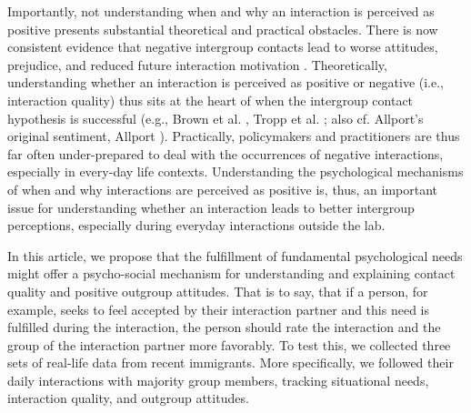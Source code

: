 \documentclass[man, 12pt, a4paper, mask]{apa7}
\theoremstyle{break}
\theoremstyle{plain}
\begin{document}
Importantly, not understanding when and why an interaction is perceived as positive presents substantial theoretical and practical obstacles. There is now consistent evidence that negative intergroup contacts lead to worse attitudes, prejudice, and reduced future interaction motivation \citep[e.g.,][]{Barlow2012, Prati2021, Graf2014}. Theoretically, understanding whether an interaction is perceived as positive or negative (i.e., interaction quality) thus sits at the heart of when the intergroup contact hypothesis is successful (e.g., Brown et al. \citeyear{Brown2007}, Tropp et al. \citeyear{Tropp2016}; also cf. Allport’s original sentiment, Allport \citeyear{Allport1954b}). Practically, policymakers and practitioners are thus far often under-prepared to deal with the occurrences of negative interactions, especially in every-day life contexts. Understanding the psychological mechanisms of when and why interactions are perceived as positive is, thus, an important issue for understanding whether an interaction leads to better intergroup perceptions, especially during everyday interactions outside the lab.

In this article, we propose that the fulfillment of fundamental psychological needs might offer a psycho-social mechanism for understanding and explaining contact quality and positive outgroup attitudes. That is to say, that if a person, for example, seeks to feel accepted by their interaction partner and this need is fulfilled during the interaction, the person should rate the interaction and the group of the interaction partner more favorably. To test this, we collected three sets of real-life data from recent immigrants. More specifically, we followed their daily interactions with majority group members, tracking situational needs, interaction quality, and outgroup attitudes. 
\end{document}

